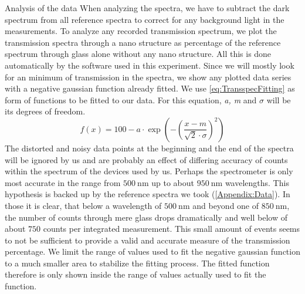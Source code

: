 \documentclass[pdftex, a4paper,11pt, twoside, UKenglish]{report}
\begin{document}
  \begin{chapter}{Analysis of the data}
    \label{chp:Analysis}
    When analyzing the spectra, we have to subtract the dark spectrum from
    all reference spectra to correct for any background light in the
    measurements.
    To analyze any recorded transmission spectrum, we plot the transmission
    spectra through a nano structure as percentage of the reference spectrum
    through glass alone without any nano structure.
    All this is done automatically by the software used in this experiment.
    Since we will mostly look for an minimum of transmission in the spectra,
    we show any plotted data series with a negative gaussian function already
    fitted. We use \cref{eq:TransspecFitting} as form of functions to be fitted
    to our data. For this equation, \textit{a, m} and \textit{$\sigma$} will be
    its degrees of freedom.
    \begin{equation}
      \label{eq:TransspecFitting}
      f(x)=100-a\cdot \exp\left(-\left(\frac{x-m}{\sqrt{2}\cdot\sigma}
      \right)^{2}\right)
    \end{equation}
    The distorted and noisy data points at the beginning and the end of the
    spectra will be ignored by us and are probably an effect of differing
    accuracy of counts within the spectrum  of the devices used by us.
    Perhaps the spectrometer is only most accurate in the range from
    $\SI{500}{\nano\meter}$ up to about $\SI{950}{\nano\meter}$ wavelengths.
    This hypothesis is backed up by the reference spectra we took 
    (\cref{Appendix:Data}).
    In those it is clear, that below a wavelength of $\SI{500}{\nano\meter}$
    and beyond one of $\SI{850}{\nano\meter}$, the number of counts through
    mere glass drops dramatically and well below of about $750$ counts per
    integrated measurement. This small amount of events seems to not be
    sufficient to provide a valid and accurate measure of the transmission
    percentage.
    We limit the range of values used to fit the negative
    gaussian function to a much smaller area to stabilize the fitting process.
    The fitted function therefore is only shown inside the range of values
    actually used to fit the function. 


\end{chapter}
\end{document}
